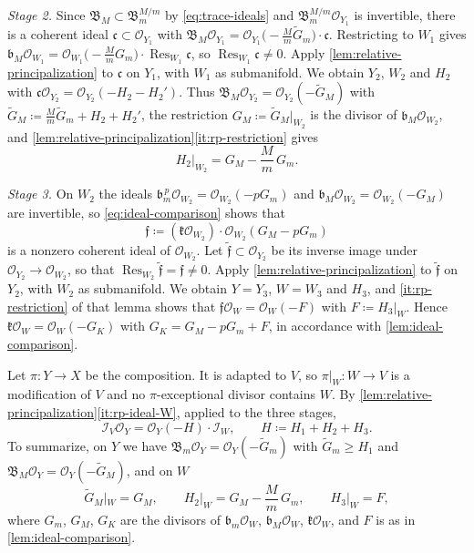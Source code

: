 \documentclass[11pt,a4paper]{amsart}
\newcommand{\rest}[1]{\operatorname{Res}_{#1}}   %
\theoremstyle{definition}
\begin{document}
\emph{Stage 2.} Since $\mathfrak B_M\subset\mathfrak B_m^{M/m}$ by
\eqref{eq:trace-ideals} and $\mathfrak B_m^{M/m}\mathcal O_{Y_1}$ is
invertible, there is a coherent ideal $\mathfrak c\subset\mathcal O_{Y_1}$
with
$\mathfrak B_M\mathcal O_{Y_1}=\mathcal O_{Y_1}\bigl(-\tfrac Mm\widetilde G_m\bigr)\cdot\mathfrak c$.
Restricting to $W_1$ gives
$\mathfrak b_M\mathcal O_{W_1}=\mathcal O_{W_1}\bigl(-\tfrac MmG_m\bigr)\cdot\rest{W_1}\mathfrak c$,
so $\rest{W_1}\mathfrak c\ne0$. Apply
\cref{lem:relative-principalization} to $\mathfrak c$ on $Y_1$, with
$W_1$ as submanifold. We obtain $Y_2$, $W_2$ and $H_2$ with
$\mathfrak c\mathcal O_{Y_2}=\mathcal O_{Y_2}(-H_2-H_2')$. Thus
$\mathfrak B_M\mathcal O_{Y_2}=\mathcal O_{Y_2}(-\widetilde G_M)$ with
$\widetilde G_M\coloneqq \tfrac Mm\widetilde G_m+H_2+H_2'$, the restriction
$G_M\coloneqq \widetilde G_M|_{W_2}$ is the divisor of
$\mathfrak b_M\mathcal O_{W_2}$, and
\cref{lem:relative-principalization}\ref{it:rp-restriction} gives
\[
  H_2|_{W_2}=G_M-\frac Mm\,G_m .
\]

\emph{Stage 3.} On $W_2$ the ideals $\mathfrak b_m^{\,p}\mathcal O_{W_2}=\mathcal
O_{W_2}(-pG_m)$ and $\mathfrak b_M\mathcal O_{W_2}=\mathcal O_{W_2}(-G_M)$
are invertible, so \eqref{eq:ideal-comparison} shows that
\[
  \mathfrak f\coloneqq (\mathfrak k\mathcal O_{W_2})\cdot
  \mathcal O_{W_2}(G_M-pG_m)
\]
is a nonzero coherent ideal of $\mathcal O_{W_2}$. Let
$\widetilde{\mathfrak f}\subset\mathcal O_{Y_2}$ be its inverse image under
$\mathcal O_{Y_2}\to\mathcal O_{W_2}$, so that
$\rest{W_2}\widetilde{\mathfrak f}=\mathfrak f\ne0$. Apply
\cref{lem:relative-principalization} to $\widetilde{\mathfrak f}$ on
$Y_2$, with $W_2$ as submanifold. We obtain $Y=Y_3$, $W=W_3$ and $H_3$,
and \ref{it:rp-restriction} of that lemma shows that
$\mathfrak f\mathcal O_W=\mathcal O_W(-F)$ with $F\coloneqq H_3|_W$. Hence
$\mathfrak k\mathcal O_W=\mathcal O_W(-G_K)$ with $G_K=G_M-pG_m+F$, in
accordance with \cref{lem:ideal-comparison}.

Let $\pi\colon Y\to X$ be the composition. It is adapted to $V$, so
$\pi|_W\colon W\to V$ is a modification of $V$ and no $\pi$-exceptional
divisor contains $W$. By
\cref{lem:relative-principalization}\ref{it:rp-ideal-W}, applied to the
three stages,
\begin{equation}\label{eq:IV-H}
  \mathcal I_V\mathcal O_Y=\mathcal O_Y(-H)\cdot\mathcal I_W,
  \qquad H\coloneqq H_1+H_2+H_3 .
\end{equation}
To summarize, on $Y$ we have
$\mathfrak B_m\mathcal O_Y=\mathcal O_Y(-\widetilde G_m)$ with
$\widetilde G_m\ge H_1$ and
$\mathfrak B_M\mathcal O_Y=\mathcal O_Y(-\widetilde G_M)$, and on $W$
\begin{equation}\label{eq:restrictions}
  \widetilde G_M|_W=G_M,\qquad
  H_2|_W=G_M-\frac Mm\,G_m,\qquad
  H_3|_W=F,
\end{equation}
where $G_m$, $G_M$, $G_K$ are the divisors of $\mathfrak b_m\mathcal O_W$,
$\mathfrak b_M\mathcal O_W$, $\mathfrak k\mathcal O_W$, and $F$ is as in
\cref{lem:ideal-comparison}.
\end{document}
